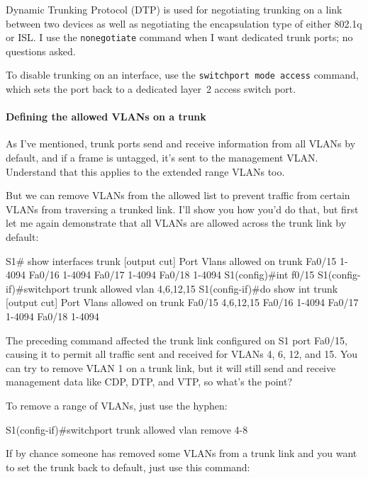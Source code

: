 \begin{note}
Dynamic Trunking Protocol (DTP) is used for negotiating trunking on a link between two devices as well as negotiating the encapsulation type of either 802.1q or ISL.
I use the \texttt{nonegotiate} command when I want dedicated trunk ports; no questions asked.
\end{note}


To disable trunking on an interface, use the \texttt{switchport\ mode\ access} command, which sets the port back to a dedicated layer~2 access switch port.

\paragraph{Defining the allowed VLANs on a trunk}

As I've mentioned, trunk ports send and receive information from all
VLANs by default, and if a frame is untagged, it's sent to the
management VLAN. Understand that this applies to the extended range
VLANs too.

But we can remove VLANs from the allowed list to prevent traffic from
certain VLANs from traversing a trunked link. I'll show you how you'd do
that, but first let me again demonstrate that all VLANs are allowed
across the trunk link by default:

\begin{cli}
S1# show interfaces trunk
[output cut]
Port        Vlans allowed on trunk
Fa0/15      1-4094
Fa0/16      1-4094
Fa0/17      1-4094
Fa0/18      1-4094
S1(config)#int f0/15
S1(config-if)#switchport trunk allowed vlan 4,6,12,15
S1(config-if)#do show int trunk
[output cut]
Port        Vlans allowed on trunk
Fa0/15      4,6,12,15
Fa0/16      1-4094
Fa0/17      1-4094
Fa0/18      1-4094
\end{cli}

The preceding command
affected the trunk link configured on S1 port Fa0/15, causing it to
permit all traffic sent and received for VLANs 4, 6, 12, and 15. You can
try to remove VLAN 1 on a trunk link, but it will still send and receive
management data like CDP, DTP, and VTP, so what's the point?

To remove a range of VLANs, just use the hyphen:

\begin{cli}
S1(config-if)#switchport trunk allowed vlan remove 4-8
\end{cli}

If by chance someone has removed some VLANs from a trunk link and you
want to set the trunk back to default, just use this command:

